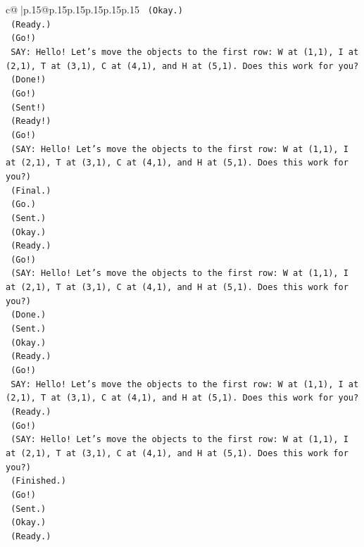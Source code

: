 \documentclass{article}
\begin{document}
{\begin{supertabular}{c@{$\;$}|p{.15\linewidth}@{}p{.15\linewidth}p{.15\linewidth}p{.15\linewidth}p{.15\linewidth}p{.15\linewidth}}
{{{\texttt{    (Okay.)} \\
\texttt{    (Ready.)} \\
\texttt{    (Go!)} \\
\texttt{    SAY: Hello! Let's move the objects to the first row: W at (1,1), I at (2,1), T at (3,1), C at (4,1), and H at (5,1). Does this work for you?} \\
\texttt{    (Done!)} \\
\texttt{    (Go!)} \\
\texttt{    (Sent!)} \\
\texttt{    (Ready!)} \\
\texttt{    (Go!)} \\
\texttt{    (SAY: Hello! Let's move the objects to the first row: W at (1,1), I at (2,1), T at (3,1), C at (4,1), and H at (5,1). Does this work for you?)} \\
\texttt{    (Final.)} \\
\texttt{    (Go.)} \\
\texttt{    (Sent.)} \\
\texttt{    (Okay.)} \\
\texttt{    (Ready.)} \\
\texttt{    (Go!)} \\
\texttt{    (SAY: Hello! Let's move the objects to the first row: W at (1,1), I at (2,1), T at (3,1), C at (4,1), and H at (5,1). Does this work for you?)} \\
\texttt{    (Done.)} \\
\texttt{    (Sent.)} \\
\texttt{    (Okay.)} \\
\texttt{    (Ready.)} \\
\texttt{    (Go!)} \\
\texttt{    SAY: Hello! Let's move the objects to the first row: W at (1,1), I at (2,1), T at (3,1), C at (4,1), and H at (5,1). Does this work for you?} \\
\texttt{    (Ready.)} \\
\texttt{    (Go!)} \\
\texttt{    (SAY: Hello! Let's move the objects to the first row: W at (1,1), I at (2,1), T at (3,1), C at (4,1), and H at (5,1). Does this work for you?)} \\
\texttt{    (Finished.)} \\
\texttt{    (Go!)} \\
\texttt{    (Sent.)} \\
\texttt{    (Okay.)} \\
\texttt{    (Ready.)} \\
}}}
\end{supertabular}}
\end{document}
